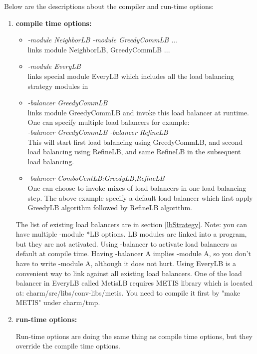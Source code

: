 Below are the descriptions about the compiler and run-time options:

\begin{enumerate}
\item {\bf compile time options:}

\begin{itemize}
\item {\em -module NeighborLB -module GreedyCommLB ...}  \\
  links module NeighborLB, GreedyCommLB ...
\item {\em -module EveryLB} \\
  links special module EveryLB which includes all the load balancing strategy modules in \charmpp{}
\item {\em -balancer GreedyCommLB} \\
  links module GreedyCommLB and invoke this load balancer at runtime. One can specify multiple load balancers for example: \\
   {\em -balancer GreedyCommLB -balancer RefineLB}   \\
   This will start first load balancing using GreedyCommLB, and second load balancing using RefineLB, and same RefineLB in the subsequent load balancing.
\item {\em -balancer ComboCentLB:GreedyLB,RefineLB}  \\
   One can choose to invoke mixes of load balancers in one load balancing step. The above example specify a default load balancer which first apply GreedyLB algorithm followed by RefineLB algorithm.
\end{itemize}

The list of existing load balancers are in section \ref{lbStrategy}.
Note: you can have multiple -module *LB options. LB modules are
linked into a program, but they are not activated.
Using -balancer to activate load balancers as default at compile time. 
Having -balancer A implies -module A, so you don't have to write -module A, 
although it does not hurt.
Using EveryLB is a convenient way to link against all existing load balancers. 
One of the load balancer in EveryLB called MetisLB requires METIS library 
which is located at: charm/src/libs/conv-libs/metis. 
You need to compile it first by "make METIS" under charm/tmp.

\item {\bf run-time options:}

Run-time options are doing the same thing as compile time options, but they override the compile time options.


\end{enumerate}
